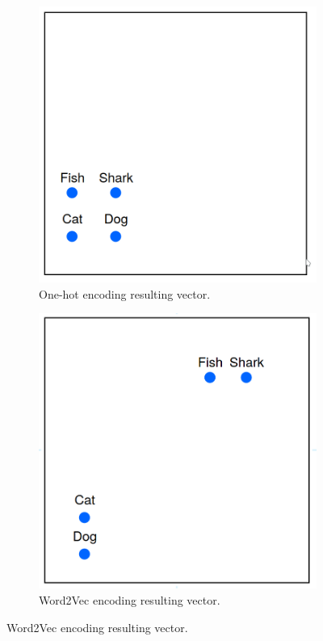         \begin{figure}[H]
            \centering
            \captionsetup{justification=centering}
          
            \begin{subfigure}{0.32\textwidth}
            \includegraphics[width=\textwidth]{Sections/3StateOfTheArt/3_images/one_hot_ex.png} 
            \caption{One-hot encoding resulting vector. \cite{word2vec_explained}}
          
            \end{subfigure}
            \begin{subfigure}{0.32\textwidth}
            \includegraphics[width=\textwidth]{Sections/3StateOfTheArt/3_images/word2vec_encode.png}\hfill
            \caption{Word2Vec encoding resulting vector. \cite{word2vec_explained}}
            \end{subfigure}


\end{figure}
